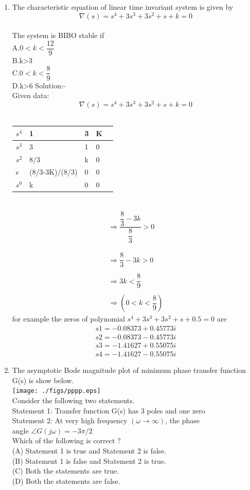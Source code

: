 \documentclass[journal,12pt,twocolumn]{IEEEtran}
\renewcommand\thesection{\arabic{section}}
\begin{document}
\begin{enumerate}[label=\arabic*.,ref=\thesection.\theenumi]
\item
The characteristic equation of linear time invariant system is given by 
$$\nabla(s)=s^4+3s^3+3s^2+s+k=0$$
\\The system is BIBO stable if
\\A.$0<k<\dfrac{12}{9}$
\\B.k>3
\\C.$0<k<\dfrac{8}{9}$
\\D.k>6
{Solution:- }
\\Given data: $$\nabla(s)=s^4+3s^3+3s^2+s+k=0$$
\\
\begin{tabular}{ |p{2cm}|p{2cm}|p{2cm}|p{1cm}|p{1cm}| }
 \hline
$s^4$ &1&3&K\\
 \hline
 $s^3$ & 3&1 & 0\\
 \hline
 $s^2$ & 8/3 & k & 0\\
 \hline 
 s & (8/3-3K)/(8/3) & 0 & 0\\
 \hline 
$s^0$ & k& 0& 0\\
\hline
\end{tabular}
\\ 
\begin{align}
\Rightarrow \dfrac{\dfrac{8}{3}-3k}{\dfrac{8}{3}}>0
\\
\\
\\ \Rightarrow {\dfrac{8}{3}-3k} >0
\\
\\ \Rightarrow 3k<\dfrac{8}{9}
\\
\\ \Rightarrow (0<k<\dfrac{8}{9})
\end{align}
for example the zeros of polynomial $s^4+3s^3+3s^2+s+0.5=0$ are 
\begin{align}
 s1=-0.08373+0.45773i
\\ s2=-0.08373-0.45773i
\\ s3=-1.41627+0.55075i
\\ s4=-1.41627-0.55075i
\end{align}

\item
The asymptotic Bode magnitude plot of  minimum phase transfer function
G(s) is show below.
\\
\texttt{[image: ./figs/pppp.eps]}
\\  
Consider the following two statements.\\
\quad Statement 1: Transfer function G(s) has 3 poles and one zero \\
\quad Statement 2: At very high frequency $(\omega \to \infty)$, the phase \\  \quad \quad \quad \quad \quad \quad angle $ \angle G(j\omega)=-3\pi/2$ \\ 
Which of the following is correct ? \\
(A) Statement 1 is true and Statement 2 is false.\\
(B) Statement 1 is false and Statement 2 is true.\\
(C) Both the statements are true.\\
(D) Both the statements are false.
\\




\end{enumerate}
\end{document}
